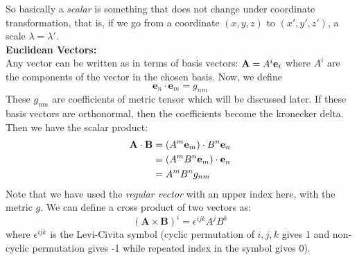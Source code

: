 \noindent
So basically a \textit{scalar} is something that does not change under coordinate transformation, that is, if we go from a coordinate $(x,y,z)$ to $(x',y',z')$, a scale $\lambda = \lambda'$.\\[0.3cm]
\textbf{Euclidean Vectors:}\\[0.3cm]
Any vector can be written as in terms of basis vectors: $\mathbf{A} = \tensor{A}{^i}\mathbf{e}_i$ where $A^i$ are the components of the vector in the chosen basis. Now, we define $$\mathbf{e}_n\cdot \mathbf{e}_m = g_{nm}$$
These $g_{nm}$ are coefficients of metric tensor which will be discussed later. If these basis vectors are orthonormal, then the coefficients become the kronecker delta. Then we have the scalar product:
\begin{align*}
    \mathbf{A}\cdot \mathbf{B} &=  (\tensor{A}{^m}\mathbf{e}_m)\cdot  \tensor{B}{^n}\mathbf{e}_n\\
    &=(\tensor{A}{^m}\tensor{B}{^n}\mathbf{e}_m)\cdot  \mathbf{e}_n\\
    &=\tensor{A}{^m}\tensor{B}{^n}g_{nm}
\end{align*}
Note that we have used the \textit{regular vector} with an upper index here, with the metric $g$. We can define a cross product of two vectors as:
$$(\mathbf{A}\times \mathbf{B})^i = \epsilon^{ijk}A^jB^k$$
where $\epsilon^{ijk}$ is the Levi-Civita symbol (cyclic permutation of ${i,j,k}$ gives 1 and non-cyclic permutation gives -1 while repeated index in the symbol gives 0). 
